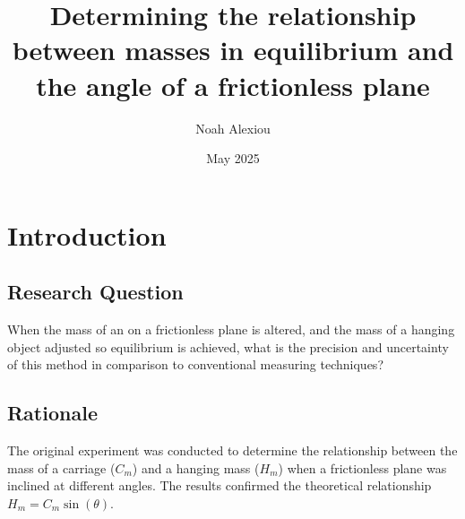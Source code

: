 \documentclass[11pt,a4paper]{article}
\begin{document}
\nocite{*}
\begin{titlepage}


\title{Determining the relationship between masses in equilibrium and the angle of a frictionless plane}

\author{Noah Alexiou}


\date{May 2025}

\maketitle
\centering

\end{titlepage}
\tableofcontents
\newpage

\section{Introduction}

\subsection{Research Question}
When the mass of an on a frictionless plane is altered, and the mass of a hanging object adjusted so equilibrium is achieved, what is the precision and uncertainty of this method in comparison to conventional measuring techniques? 

\subsection{Rationale}

The original experiment was conducted to determine the relationship between the mass of a carriage ($C_m$) and a hanging mass ($H_m$) when a frictionless plane was inclined at different angles. The results confirmed the theoretical relationship $H_m = C_m \sin(\theta)$.
\end{document}
